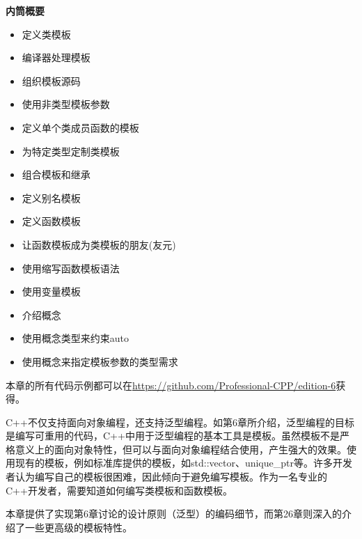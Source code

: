 \noindent
\textbf{内筒概要}

\begin{itemize}
\item
定义类模板

\item
编译器处理模板

\item
组织模板源码

\item
使用非类型模板参数

\item
定义单个类成员函数的模板

\item
为特定类型定制类模板

\item
组合模板和继承

\item
定义别名模板

\item
定义函数模板

\item
让函数模板成为类模板的朋友(友元)

\item
使用缩写函数模板语法

\item
使用变量模板

\item
介绍概念

\item
使用概念类型来约束auto

\item
使用概念来指定模板参数的类型需求
\end{itemize}

本章的所有代码示例都可以在\url{https://github.com/Professional-CPP/edition-6}获得。

C++不仅支持面向对象编程，还支持泛型编程。如第6章所介绍，泛型编程的目标是编写可重用的代码，C++中用于泛型编程的基本工具是模板。虽然模板不是严格意义上的面向对象特性，但可以与面向对象编程结合使用，产生强大的效果。使用现有的模板，例如标准库提供的模板，如std::vector、unique\_ptr等。许多开发者认为编写自己的模板很困难，因此倾向于避免编写模板。作为一名专业的C++开发者，需要知道如何编写类模板和函数模板。

本章提供了实现第6章讨论的设计原则（泛型）的编码细节，而第26章则深入的介绍了一些更高级的模板特性。



















